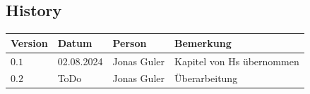 \documentclass[11pt,oneside]{article}
\begin{document}
\newpage
\subsection*{History}
\begin{table}[H]
	\centering
	\begin{tabular}{|p{13mm}|p{20mm}|p{30mm}|p{70mm}|}\hline
		Version & Datum & Person & Bemerkung \\\hline
		$0.1$ & 02.08.2024 & Jonas Guler & Kapitel von Hs übernommen \\\hline
		$0.2$ & ToDo & Jonas Guler & Überarbeitung \\\hline
	\end{tabular}
\end{table}
\end{document}
